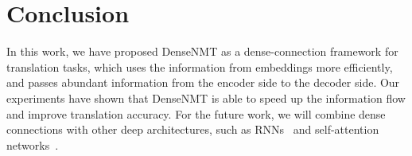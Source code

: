 \documentclass[11pt,a4paper]{article}
\begin{document}
\section{Conclusion}
In this work, we have proposed DenseNMT as a dense-connection framework for translation tasks, which uses the information from embeddings more efficiently, and passes abundant information from the encoder side to the decoder side. Our experiments have shown that DenseNMT
is able to speed up the information flow and improve translation accuracy. For the future work, we will combine dense connections with other deep architectures, such as RNNs~\cite{gnmt} and self-attention networks~\cite{transformer}.




\end{document}
